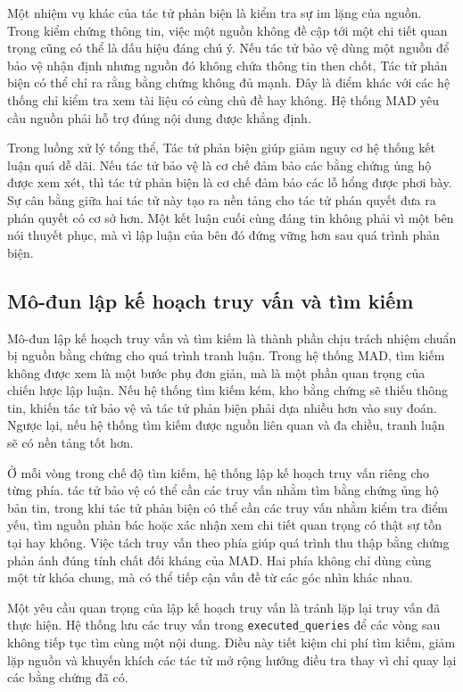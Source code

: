 ﻿\documentclass[oneside,a4paper,12pt]{extreport}
\begin{document}
Một nhiệm vụ khác của tác tử phản biện là kiểm tra sự im lặng của nguồn. Trong kiểm chứng thông tin, việc một nguồn không đề cập tới một chi tiết quan trọng cũng có thể là dấu hiệu đáng chú ý. Nếu tác tử bảo vệ dùng một nguồn để bảo vệ nhận định nhưng nguồn đó không chứa thông tin then chốt, Tác tử phản biện có thể chỉ ra rằng bằng chứng không đủ mạnh. Đây là điểm khác với các hệ thống chỉ kiểm tra xem tài liệu có cùng chủ đề hay không. Hệ thống MAD yêu cầu nguồn phải hỗ trợ đúng nội dung được khẳng định.

Trong luồng xử lý tổng thể, Tác tử phản biện giúp giảm nguy cơ hệ thống kết luận quá dễ dãi. Nếu tác tử bảo vệ là cơ chế đảm bảo các bằng chứng ủng hộ được xem xét, thì tác tử phản biện là cơ chế đảm bảo các lỗ hổng được phơi bày. Sự cân bằng giữa hai tác tử này tạo ra nền tảng cho tác tử phán quyết đưa ra phán quyết có cơ sở hơn. Một kết luận cuối cùng đáng tin không phải vì một bên nói thuyết phục, mà vì lập luận của bên đó đứng vững hơn sau quá trình phản biện.

\subsection{Mô-đun lập kế hoạch truy vấn và tìm kiếm}

Mô-đun lập kế hoạch truy vấn và tìm kiếm là thành phần chịu trách nhiệm chuẩn bị nguồn bằng chứng cho quá trình tranh luận. Trong hệ thống MAD, tìm kiếm không được xem là một bước phụ đơn giản, mà là một phần quan trọng của chiến lược lập luận. Nếu hệ thống tìm kiếm kém, kho bằng chứng sẽ thiếu thông tin, khiến tác tử bảo vệ và tác tử phản biện phải dựa nhiều hơn vào suy đoán. Ngược lại, nếu hệ thống tìm kiếm được nguồn liên quan và đa chiều, tranh luận sẽ có nền tảng tốt hơn.

Ở mỗi vòng trong chế độ tìm kiếm, hệ thống lập kế hoạch truy vấn riêng cho từng phía. tác tử bảo vệ có thể cần các truy vấn nhằm tìm bằng chứng ủng hộ bản tin, trong khi tác tử phản biện có thể cần các truy vấn nhằm kiểm tra điểm yếu, tìm nguồn phản bác hoặc xác nhận xem chi tiết quan trọng có thật sự tồn tại hay không. Việc tách truy vấn theo phía giúp quá trình thu thập bằng chứng phản ánh đúng tính chất đối kháng của MAD. Hai phía không chỉ dùng cùng một từ khóa chung, mà có thể tiếp cận vấn đề từ các góc nhìn khác nhau.

Một yêu cầu quan trọng của lập kế hoạch truy vấn là tránh lặp lại truy vấn đã thực hiện. Hệ thống lưu các truy vấn trong \texttt{executed\_queries} để các vòng sau không tiếp tục tìm cùng một nội dung. Điều này tiết kiệm chi phí tìm kiếm, giảm lặp nguồn và khuyến khích các tác tử mở rộng hướng điều tra thay vì chỉ quay lại các bằng chứng đã có.
\end{document}

